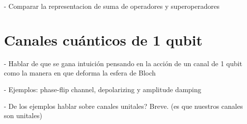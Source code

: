 - Comparar la representacion de suma de operadores y superoperadores


\section{Canales cuánticos de 1 qubit}
- Hablar de que se gana intuición pensando en la acción de un canal de 1
qubit como la manera en que deforma la esfera de Bloch

- Ejemplos: phase-flip channel, depolarizing y amplitude damping 

- De los ejemplos hablar sobre canales unitales? Breve. (es que nuestros
canales son unitales)


